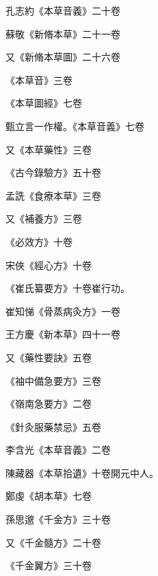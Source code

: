 \begin{pinyinscope}
 孔志約《本草音義》二十卷



 蘇敬《新脩本草》二十一卷



 又《新脩本草圖》二十六卷



 《本草音》三卷



 《本草圖經》七卷



 甄立言一作權。《本草音義》七卷



 又《本草藥性》三卷



 《古今錄驗方》五十卷



 孟詵《食療本草》三卷



 又《補養方》三卷



 《必效方》十卷



 宋俠《經心方》十卷



 《崔氏纂要方》十卷崔行功。



 崔知悌《骨蒸病灸方》一卷



 王方慶《新本草》四十一卷



 又《藥性要訣》五卷



 《袖中備急要方》三卷



 《嶺南急要方》二卷



 《針灸服藥禁忌》五卷



 李含光《本草音義》二卷



 陳藏器《本草拾遺》十卷開元中人。



 鄭虔《胡本草》七卷



 孫思邈《千金方》三十卷



 又《千金髓方》二十卷



 《千金翼方》三十卷




\end{pinyinscope}
